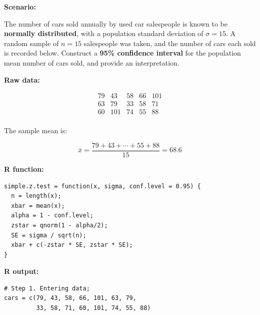 \begin{example}

\vspace{1em}

\noindent\textbf{Scenario:}

\vspace{0.5em}

The number of cars sold annually by used car salespeople is known to be \textbf{normally distributed}, with a population standard deviation of $\sigma = 15$. A random sample of $n = 15$ salespeople was taken, and the number of cars each sold is recorded below. Construct a \textbf{95\% confidence interval} for the population mean number of cars sold, and provide an interpretation.

\vspace{1em}

\noindent\textbf{Raw data:}

\[
\begin{matrix}
79 & 43 & 58 & 66 & 101 \\
63 & 79 & 33 & 58 & 71 \\
60 & 101 & 74 & 55 & 88 \\
\end{matrix}
\]

\vspace{0.5em}

\noindent The sample mean is:

\[
\bar{x} = \frac{79 + 43 + \cdots + 55 + 88}{15} = 68.6
\]

\vspace{1em}

\noindent\textbf{R function:}

\begin{tcolorbox}[colback=gray!10, colframe=gray!50, arc=2mm]
\begin{verbatim}
simple.z.test = function(x, sigma, conf.level = 0.95) {
  n = length(x);
  xbar = mean(x);
  alpha = 1 - conf.level;
  zstar = qnorm(1 - alpha/2);
  SE = sigma / sqrt(n);
  xbar + c(-zstar * SE, zstar * SE);
}
\end{verbatim}
\end{tcolorbox}

\vspace{0.5em}

\noindent\textbf{R output:}

\begin{tcolorbox}[colback=gray!10, colframe=gray!50, arc=2mm]
\begin{verbatim}
# Step 1. Entering data;
cars = c(79, 43, 58, 66, 101, 63, 79,
         33, 58, 71, 60, 101, 74, 55, 88)


\end{verbatim}
\end{tcolorbox}
\end{example}
